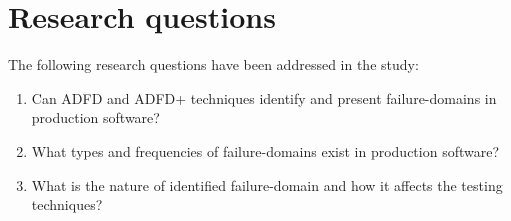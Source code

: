 \section{Research questions} \label{sec:questions}
The following research questions have been addressed in the study:
\begin{enumerate}
%
\item Can ADFD and ADFD+ techniques identify and present failure-domains in production software? %

%
%
\item What types and frequencies of failure-domains exist in production software? %
%
\item What is the nature of identified failure-domain and how it affects the testing techniques? %

%


\end{enumerate}
